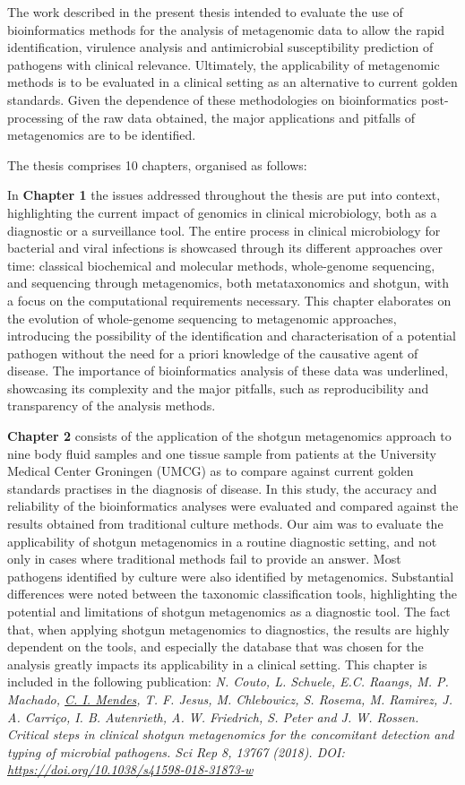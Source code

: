The work described in the present thesis intended to evaluate the use of bioinformatics methods for the analysis of metagenomic data to allow the rapid identification, virulence analysis and antimicrobial susceptibility prediction of pathogens with clinical relevance. Ultimately, the applicability of metagenomic methods is to be evaluated in a clinical setting as an alternative to current golden standards. Given the dependence of these methodologies on bioinformatics post-processing of the raw data obtained, the major applications and pitfalls of metagenomics are to be identified. 

The thesis comprises 10 chapters, organised as follows:

In \textbf{Chapter 1} the issues addressed throughout the thesis are put into context, highlighting the current impact of genomics in clinical microbiology, both as a diagnostic or a surveillance tool. The entire process in clinical microbiology for bacterial and viral infections is showcased through its different approaches over time: classical biochemical and molecular methods, whole-genome sequencing, and sequencing through metagenomics, both metataxonomics and shotgun, with a focus on the computational requirements necessary. This chapter elaborates on the evolution of whole-genome sequencing to metagenomic approaches, introducing the possibility of the identification and characterisation of a potential pathogen without the need for a priori knowledge of the causative agent of disease. The importance of bioinformatics analysis of these data was underlined, showcasing its complexity and the major pitfalls, such as reproducibility and transparency of the analysis methods.   

\textbf{Chapter 2} consists of the application of the shotgun metagenomics approach to nine body fluid samples and one tissue sample from patients at the University Medical Center Groningen (UMCG) as to compare against current golden standards practises in the diagnosis of disease. In this study, the accuracy and reliability of the bioinformatics analyses were evaluated and compared against the results obtained from traditional culture methods. Our aim was to evaluate the applicability of shotgun metagenomics in a routine diagnostic setting, and not only in cases where traditional methods fail to provide an answer. Most pathogens identified by culture were also identified by metagenomics. Substantial differences were noted between the taxonomic classification tools, highlighting the potential and limitations of shotgun metagenomics as a diagnostic tool. The fact that, when applying shotgun metagenomics to diagnostics, the results are highly dependent on the tools, and especially the database that was chosen for the analysis greatly impacts its applicability in a clinical setting. This chapter is included in the following publication:\textit{ N. Couto, L. Schuele, E.C. Raangs, M. P. Machado, \underline{C. I. Mendes}, T. F. Jesus, M. Chlebowicz,  S. Rosema, M. Ramirez, J. A. Carriço, I. B. Autenrieth, A. W. Friedrich, S. Peter and J. W. Rossen. Critical steps in clinical shotgun metagenomics for the concomitant detection and typing of microbial pathogens. Sci Rep 8, 13767 (2018). DOI: \url{https://doi.org/10.1038/s41598-018-31873-w}}


